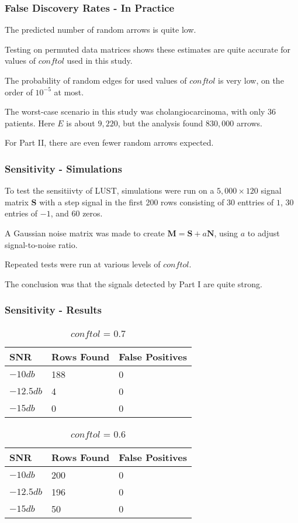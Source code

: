 \documentclass[
	11pt, %
]{beamer}
\begin{document}
\begin{frame}
    \frametitle{False Discovery Rates - In Practice}
    The predicted number of random arrows is quite low.
    \pause
    \bigskip

    Testing on permuted data matrices shows these estimates are quite accurate for values of $conftol$ used in this study.
    \pause
    \bigskip

    The probability of random edges for used values of $conftol$ is very low, on the order of $10^{-5}$ at most.
    \pause
    \bigskip

    The worst-case scenario in this study was cholangiocarcinoma, with only 36 patients. Here $E$ is about $9,220$, but the analysis found $830,000$ arrows.
    \pause
    \bigskip

    For Part II, there are even fewer random arrows expected.
\end{frame}

\begin{frame}
    \frametitle{Sensitivity - Simulations}
    To test the sensitiivty of LUST, simulations were run on a $5,000 \times 120$ signal matrix $\mathbf{S}$ with a step signal in the first 200 rows consisting of 30 enttries of $1$, 30 entries of $-1$, and 60 zeros.
    \pause
    \bigskip
    
    A Gaussian noise matrix was made to create $\mathbf{M} = \mathbf{S} + a\mathbf{N}$, using $a$ to adjust signal-to-noise ratio.
    \pause
    \bigskip
    
    Repeated tests were run at various levels of $conftol$. 
    \pause
    \bigskip
    
    The conclusion was that the signals detected by Part I are quite strong.
\end{frame}

\begin{frame}
	\frametitle{Sensitivity - Results}
	
	\begin{table}
		\begin{tabular}{l l l}
			\toprule
			\textbf{SNR} & \textbf{Rows Found} & \textbf{False Positives}\\
			\midrule
			$-10db$ & 188 & 0 \\
			$-12.5db$ & 4 & 0 \\
			$-15db$ & 0 & 0 \\
			\bottomrule
		\end{tabular}
		\caption{$conftol$ = 0.7}
	\end{table}
    \pause
    \begin{table}
		\begin{tabular}{l l l}
			\toprule
			\textbf{SNR} & \textbf{Rows Found} & \textbf{False Positives}\\
			\midrule
			$-10db$ & 200 & 0 \\
			$-12.5db$ & 196 & 0 \\
			$-15db$ & 50 & 0 \\
			\bottomrule
		\end{tabular}
		\caption{$conftol$ = 0.6}
	\end{table}
\end{frame}
\end{document}
